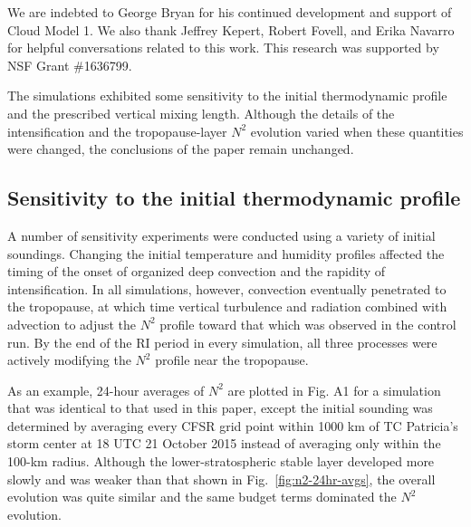 \documentclass{ametsoc}
\begin{document}
%
\acknowledgments
We are indebted to George Bryan for his continued development and support of Cloud Model 1.
We also thank Jeffrey Kepert, Robert Fovell, and Erika Navarro for helpful conversations related to this work.
This research was supported by NSF Grant \#1636799.

%
\appendix


The simulations exhibited some sensitivity to the initial thermodynamic profile and the prescribed vertical mixing length.
Although the details of the intensification and the tropopause-layer $N^2$ evolution varied when these quantities were changed, the conclusions of the paper remain unchanged.

 \subsection{Sensitivity to the initial thermodynamic profile}
A number of sensitivity experiments were conducted using a variety of initial soundings.
Changing the initial temperature and humidity profiles affected the timing of the onset of organized deep convection and the rapidity of intensification.
In all simulations, however, convection eventually penetrated to the tropopause, at which time vertical turbulence and radiation combined with advection to adjust the $N^2$ profile toward that which was observed in the control run.
By the end of the RI period in every simulation, all three processes were actively modifying the $N^2$ profile near the tropopause.

As an example, 24-hour averages of $N^2$ are plotted in Fig. A1 for a simulation that was identical to that used in this paper, except the initial sounding was determined by averaging every CFSR grid point within 1000 km of TC Patricia's storm center at 18 UTC 21 October 2015 instead of averaging only within the 100-km radius.
Although the lower-stratospheric stable layer developed more slowly and was weaker than that shown in Fig.~\ref{fig:n2-24hr-avgs}, the overall evolution was quite similar and the same budget terms dominated the $N^2$ evolution.
\end{document}
